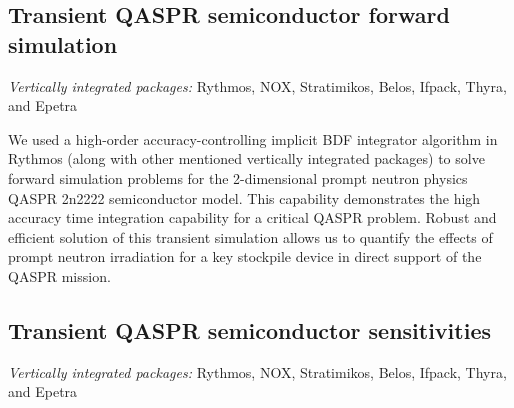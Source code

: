 \documentclass[pdf,ps2pdf,11pt]{SANDreport}
\begin{document}

%
\subsection{Transient QASPR semiconductor forward simulation}
%

{}\noindent\textit{Vertically integrated packages:} Rythmos, NOX, Stratimikos,
Belos, Ifpack, Thyra, and Epetra

We used a high-order accuracy-controlling implicit BDF integrator algorithm in
Rythmos (along with other mentioned vertically integrated packages) to solve
forward simulation problems for the 2-dimensional prompt neutron physics
QASPR 2n2222 semiconductor model.
This capability
demonstrates the high accuracy time integration capability for a critical
QASPR problem.  Robust and efficient solution of this transient simulation
allows us to quantify the effects of prompt neutron irradiation for a key
stockpile device in direct support of the QASPR mission.  




%
\subsection{Transient QASPR semiconductor sensitivities}
%

{}\noindent\textit{Vertically integrated packages:} Rythmos, NOX, Stratimikos,
Belos, Ifpack, Thyra, and Epetra
\end{document}
